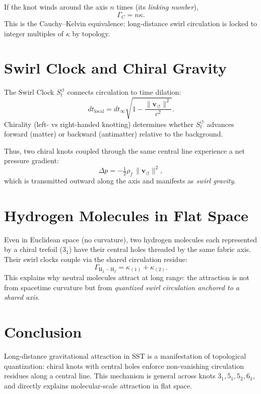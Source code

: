 \documentclass[11pt]{article}
\newcommand{\vswirl}{\mathbf{v}_{\!\boldsymbol{\circlearrowleft}}}
\newcommand{\SwirlClock}{S_t^{\boldsymbol{\circlearrowleft}}}
\newcommand{\rhoF}{\rho_{\!f}}
\newcommand{\GammaC}{\Gamma_C}
\begin{document}
If the knot winds around the axis $n$ times (its \emph{linking number}),
\begin{equation}
\GammaC = n \kappa.
\end{equation}
This is the Cauchy--Kelvin equivalence: long-distance swirl circulation is locked to integer multiples of $\kappa$ by topology.

\section{Swirl Clock and Chiral Gravity}
The Swirl Clock $\SwirlClock$ connects circulation to time dilation:
\begin{equation}
dt_{\text{local}} = dt_\infty \sqrt{1 - \frac{\lVert \vswirl \rVert^2}{c^2}}.
\end{equation}
Chirality (left- vs right-handed knotting) determines whether $\SwirlClock$ advances forward (matter) or backward (antimatter) relative to the background.

Thus, two chiral knots coupled through the same central line experience a net pressure gradient:
\begin{equation}
\Delta p = -\tfrac{1}{2}\rhoF \, \lVert \vswirl \rVert^2,
\end{equation}
which is transmitted outward along the axis and manifests as \emph{swirl gravity}.

\section{Hydrogen Molecules in Flat Space}
Even in Euclidean space (no curvature), two hydrogen molecules each represented by a chiral trefoil ($3_1$) have their central holes threaded by the same fabric axis.
Their swirl clocks couple via the shared circulation residue:
\[
\Gamma_{\text{H}_2-\text{H}_2} = \kappa_{(1)} + \kappa_{(2)}.
\]
This explains why neutral molecules attract at long range: the attraction is not from spacetime curvature but from \emph{quantized swirl circulation anchored to a shared axis}.

\section{Conclusion}
Long-distance gravitational attraction in SST is a manifestation of topological quantization: chiral knots with central holes enforce non-vanishing circulation residues along a central line.
This mechanism is general across knots $3_1, 5_1, 5_2, 6_1$, and directly explains molecular-scale attraction in flat space.



\end{document}
